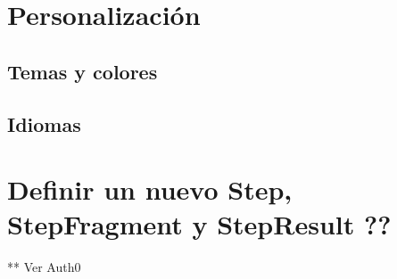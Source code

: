 \section{Personalización}

\subsection{Temas y colores}

\subsection{Idiomas}

\section{Definir un nuevo Step, StepFragment y StepResult ??} \label{sec:definir_steps}

** Ver Auth0

